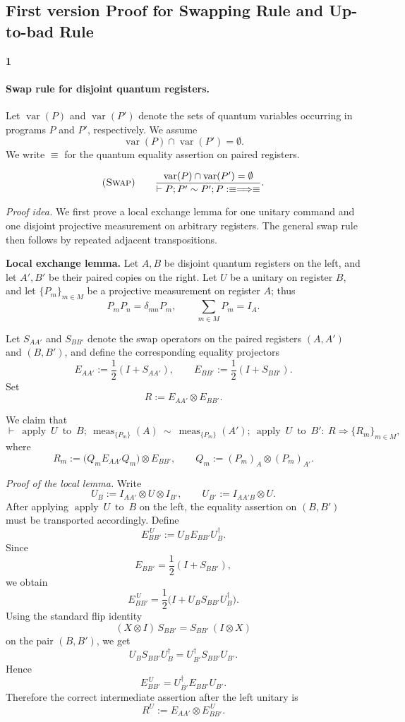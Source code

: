 \documentclass{report}
\theoremstyle{defn_style}
\begin{document}
\subsection{First version Proof for Swapping Rule and Up-to-bad Rule}
\textbf{1}

\paragraph{Swap rule for disjoint quantum registers.}
Let $\operatorname{var}(P)$ and $\operatorname{var}(P')$ denote the sets of
quantum variables occurring in programs $P$ and $P'$, respectively.
We assume
\[
\operatorname{var}(P)\cap\operatorname{var}(P')=\emptyset .
\]
We write $\equiv$ for the quantum equality assertion on paired registers.

\[
\textsc{(Swap)}\qquad
\frac{\operatorname{var}(P)\cap\operatorname{var}(P')=\emptyset}
     {\vdash P;P' \sim P';P : \equiv \Longrightarrow \equiv }.
\]

\medskip
\noindent\textit{Proof idea.}
We first prove a local exchange lemma for one unitary command and one disjoint
projective measurement on arbitrary registers.  The general swap rule then
follows by repeated adjacent transpositions.

\medskip
\noindent\textbf{Local exchange lemma.}
Let $A,B$ be disjoint quantum registers on the left, and let $A',B'$ be their
paired copies on the right.
Let $U$ be a unitary on register $B$, and let $\{P_m\}_{m\in M}$ be a projective
measurement on register $A$; thus
\[
P_mP_n=\delta_{mn}P_m,
\qquad
\sum_{m\in M}P_m=I_A .
\]

Let $S_{AA'}$ and $S_{BB'}$ denote the swap operators on the paired registers
$(A,A')$ and $(B,B')$, and define the corresponding equality projectors
\[
E_{AA'} := \frac{1}{2}(I+S_{AA'}),
\qquad
E_{BB'} := \frac{1}{2}(I+S_{BB'}).
\]
Set
\[
R := E_{AA'}\otimes E_{BB'} .
\]

We claim that
\[
\vdash\ \operatorname{apply}\ U\ \operatorname{to}\ B;\ \operatorname{meas}_{\{P_m\}}(A)
\ \sim\
\operatorname{meas}_{\{P_m\}}(A');\ \operatorname{apply}\ U\ \operatorname{to}\ B'
:\ R \Longrightarrow \{R_m\}_{m\in M},
\]
where
\[
R_m := \bigl(Q_mE_{AA'}Q_m\bigr)\otimes E_{BB'},
\qquad
Q_m := (P_m)_A\otimes (P_m)_{A'} .
\]

\medskip
\noindent\textit{Proof of the local lemma.}
Write
\[
U_B := I_{AA'}\otimes U\otimes I_{B'},
\qquad
U_{B'} := I_{AA'B}\otimes U .
\]
After applying $\operatorname{apply}\ U\ \operatorname{to}\ B$ on the left, the equality
assertion on $(B,B')$ must be transported accordingly. Define
\[
E_{BB'}^{\,U} := U_B E_{BB'} U_B^\dagger .
\]
Since
\[
E_{BB'}=\frac12(I+S_{BB'}),
\]
we obtain
\[
E_{BB'}^{\,U}
=
\frac12\bigl(I+U_BS_{BB'}U_B^\dagger\bigr).
\]
Using the standard flip identity
\[
(X\otimes I)\,S_{BB'} = S_{BB'}\,(I\otimes X)
\]
on the pair $(B,B')$, we get
\[
U_BS_{BB'}U_B^\dagger
=
U_{B'}^\dagger S_{BB'}U_{B'}.
\]
Hence
\[
E_{BB'}^{\,U}=U_{B'}^\dagger E_{BB'}U_{B'} .
\]
Therefore the correct intermediate assertion after the left unitary is
\[
R^{U}:=E_{AA'}\otimes E_{BB'}^{\,U}.
\]
\end{document}

